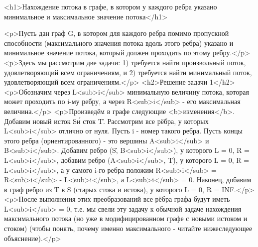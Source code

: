 <h1>Нахождение потока в графе, в котором у каждого ребра указано минимальное и максимальное значение потока</h1>

<p>Пусть дан граф G, в котором для каждого ребра помимо пропускной способности (максимального значения потока вдоль этого ребра) указано и минимальное значение потока, который должен проходить по этому ребру.</p>
<p>Здесь мы рассмотрим две задачи: 1) требуется найти произвольный поток, удовлетворяющий всем ограничениям, и 2) требуется найти минимальный поток, удовлетворяющий всем ограничениям.</p>
<h2>Решение задачи 1</h2>
<p>Обозначим через L<sub>i</sub> минимальную величину потока, которая может проходить по i-му ребру, а через R<sub>i</sub> - его максимальная величина.</p>
<p>Произведём в графе следующие <b>изменения</b>. Добавим новый исток S\' и сток T\'. Рассмотрим все рёбра, у которых L<sub>i</sub> отлично от нуля. Пусть i - номер такого ребра. Пусть концы этого ребра (ориентированного) - это вершины A<sub>i</sub> и B<sub>i</sub>. Добавим ребро (S\', B<sub>i</sub>), у которого L = 0, R = L<sub>i</sub>, добавим ребро (A<sub>i</sub>, T\'), у которого L = 0, R = L<sub>i</sub>, а у самого i-го ребра положим R<sub>i</sub> = R<sub>i</sub> - L<sub>i</sub>, а L<sub>i</sub> = 0. Наконец, добавим в граф ребро из T в S (старых стока и истока), у которого L = 0, R = INF.</p>
<p>После выполнения этих преобразований все рёбра графа будут иметь L<sub>i</sub> = 0, т.е. мы свели эту задачу к обычной задаче нахождения максимального потока (но уже в модифицированном графе с новыми истоком и стоком) (чтобы понять, почему именно максимального - читайте нижеследующее объяснение).</p>
